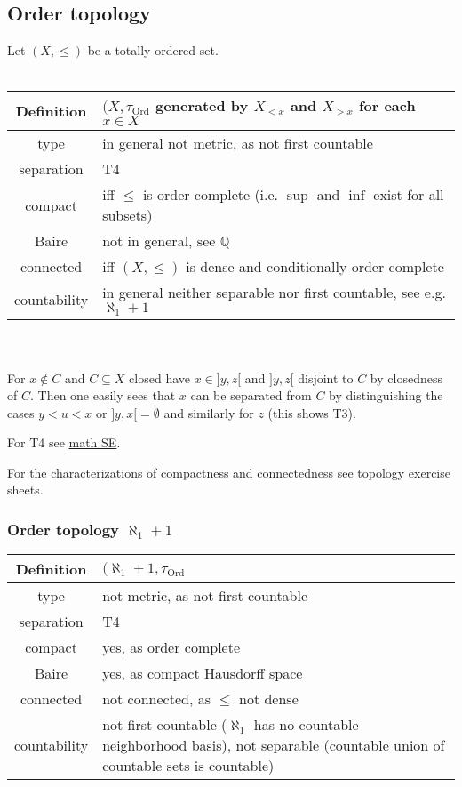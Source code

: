 \documentclass{scrartcl}
\newcommand{\Q}{\mathbb{Q}}
\begin{document}
\subsection{Order topology}
\label{top:order_topology}
Let $(X, \leq)$ be a totally ordered set.
\\\\
\begin{tabular}{c | p{}}
    Definition & $(X, \tau_{\mathrm{Ord}}$ generated by $X_{<x}$ and $X_{>x}$ for each $x \in X$ \\
    \hline
    type & in general not metric, as not first countable \\
    separation & T4 \\
    compact & iff $\leq$ is order complete (i.e. $\sup$ and $\inf$ exist for all subsets) \\
    Baire & not in general, see $\Q$ \\
    connected & iff $(X, \leq)$ is dense and conditionally order complete \\
    countability & in general neither separable nor first countable, see e.g. $\aleph_1 + 1$
\end{tabular}
\\\\
For $x \notin C$ and $C \subseteq X$ closed have $x \in ]y, z[$ and $]y, z[$ disjoint to $C$ by closedness of $C$. Then one easily sees that $x$ can be separated from $C$ by distinguishing the cases $y < u < x$ or $]y, x[ = \emptyset$ and similarly for $z$ (this shows T3).

For T4 see \href{https://math.stackexchange.com/questions/980584/is-every-linear-ordered-set-normal-in-its-order-topology}{math SE}.

For the characterizations of compactness and connectedness see topology exercise sheets.

\subsubsection{Order topology $\aleph_1 + 1$}

\begin{tabular}{c | p{}}
    Definition & $(\aleph_1 + 1, \tau_{\mathrm{Ord}}$ \\
    \hline
    type & not metric, as not first countable \\
    separation & T4 \\
    compact & yes, as order complete \\
    Baire & yes, as compact Hausdorff space \\
    connected & not connected, as $\leq$ not dense \\
    countability & not first countable ($\aleph_1$ has no countable neighborhood basis), not separable (countable union of countable sets is countable)
\end{tabular}
\end{document}
